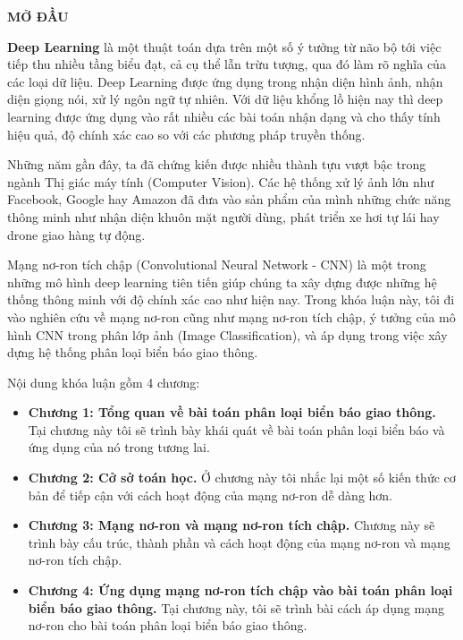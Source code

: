 \begin{center}
 \textbf{MỞ ĐẦU}
\end{center}
\par
\textbf{Deep Learning} là một thuật toán dựa trên một số ý tưởng từ não bộ tới việc tiếp thu nhiều tầng biểu đạt, cả cụ thể lẫn trừu tượng, qua đó làm rõ nghĩa của các loại dữ liệu. Deep Learning được ứng dụng trong nhận diện hình ảnh, nhận diện giọng nói, xử lý ngôn ngữ tự nhiên. Với dữ liệu khổng lồ hiện nay thì deep learning được ứng dụng vào rất nhiều các bài toán nhận dạng và cho thấy tính hiệu quả, độ chính xác cao so với các phương pháp truyền thống. \par
Những năm gần đây, ta đã chứng kiến được nhiều thành tựu vượt bậc trong ngành Thị giác máy tính (Computer Vision). Các hệ thống xử lý ảnh lớn như Facebook, Google hay Amazon đã đưa vào sản phẩm của mình những chức năng thông minh như nhận diện khuôn mặt người dùng, phát triển xe hơi tự lái hay drone giao hàng tự động. \par
Mạng nơ-ron tích chập (Convolutional Neural Network - CNN) là một trong những mô hình deep learning tiên tiến giúp chúng ta xây dựng được những hệ thống thông minh với độ chính xác cao như hiện nay. Trong khóa luận này, tôi đi vào nghiên cứu về mạng nơ-ron cũng như mạng nơ-ron tích chập, ý tưởng của mô hình CNN trong phân lớp ảnh (Image Classification), và áp dụng trong việc xây dựng hệ thống phân loại biển báo giao thông.\par
Nội dung khóa luận gồm 4 chương:
\begin{itemize}
\item[] \textbf{Chương 1: Tổng quan về bài toán phân loại biển báo giao thông.} Tại chương này tôi sẽ trình bày khái quát về bài toán phân loại biển báo và ứng dụng của nó trong tương lai.
\item[] \textbf{Chương 2: Cở sở toán học.} Ở chương này tôi nhắc lại một số kiến thức cơ bản để tiếp cận với cách hoạt động của mạng nơ-ron dễ dàng hơn.
\item[] \textbf{Chương 3: Mạng nơ-ron và mạng nơ-ron tích chập.} Chương này sẽ trình bày cấu trúc, thành phần và cách hoạt động của mạng nơ-ron và mạng nơ-ron tích chập.
\item[] \textbf{Chương 4: Ứng dụng mạng nơ-ron tích chập vào bài toán phân loại biển báo giao thông.} Tại chương này, tôi sẽ trình bài cách áp dụng mạng nơ-ron cho bài toán phân loại biển báo giao thông.
\end{itemize}